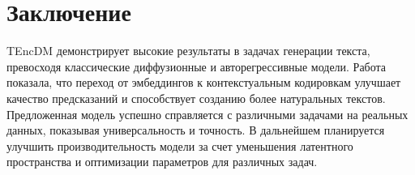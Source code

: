 \documentclass[a4paper, 12pt]{article}
\begin{document}
\section{Заключение}
TEncDM демонстрирует высокие результаты в задачах генерации текста, превосходя классические диффузионные и авторегрессивные модели. Работа показала, что переход от эмбеддингов к контекстуальным кодировкам улучшает качество предсказаний и способствует созданию более натуральных текстов. Предложенная модель успешно справляется с различными задачами на реальных данных, показывая универсальность и точность. В дальнейшем планируется улучшить производительность модели за счет уменьшения латентного пространства и оптимизации параметров для различных задач.



\end{document}
